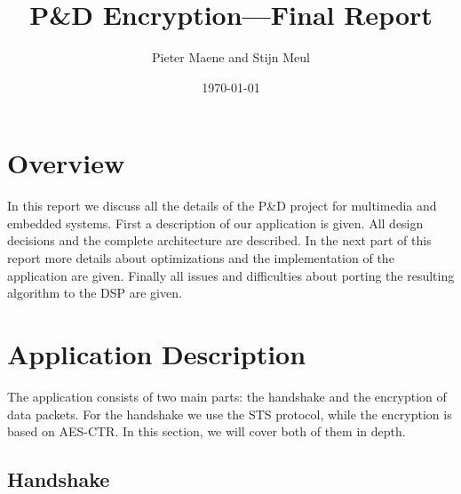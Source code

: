 \documentclass[a4paper]{article}
\title{P\&D Encryption---Final Report}
\author{Pieter Maene and Stijn Meul}
\date{\today}
\begin{document}

\maketitle

\section{Overview}
In this report we discuss all the details of the P\&D project for multimedia and embedded systems. First a description of our application is given. All design decisions and the complete architecture are described. In the next part of this report more details about optimizations and the implementation of the application are given. Finally all issues and difficulties about porting the resulting algorithm to the DSP are given.

\section{Application Description}

The application consists of two main parts: the handshake and the encryption of data packets. For the handshake we use the STS protocol, while the encryption is based on AES-CTR. In this section, we will cover both of them in depth.

\subsection{Handshake}
\end{document}
